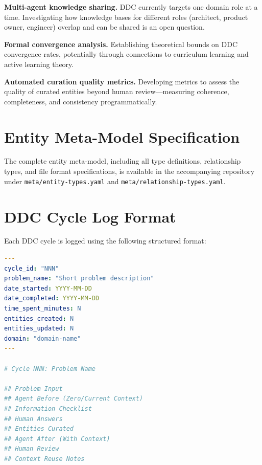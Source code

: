 \documentclass[11pt,a4paper]{article}
\begin{document}
\textbf{Multi-agent knowledge sharing.} DDC currently targets one domain role at a time. Investigating how knowledge bases for different roles (architect, product owner, engineer) overlap and can be shared is an open question.

\textbf{Formal convergence analysis.} Establishing theoretical bounds on DDC convergence rates, potentially through connections to curriculum learning and active learning theory.

\textbf{Automated curation quality metrics.} Developing metrics to assess the quality of curated entities beyond human review---measuring coherence, completeness, and consistency programmatically.




\appendix

\section{Entity Meta-Model Specification}
\label{app:metamodel}

The complete entity meta-model, including all type definitions, relationship types, and file format specifications, is available in the accompanying repository under \texttt{meta/entity-types.yaml} and \texttt{meta/relationship-types.yaml}.

\section{DDC Cycle Log Format}
\label{app:cyclelog}

Each DDC cycle is logged using the following structured format:

\begin{lstlisting}[language=yaml,caption={DDC cycle log format.}]
---
cycle_id: "NNN"
problem_name: "Short problem description"
date_started: YYYY-MM-DD
date_completed: YYYY-MM-DD
time_spent_minutes: N
entities_created: N
entities_updated: N
domain: "domain-name"
---

# Cycle NNN: Problem Name

## Problem Input
## Agent Before (Zero/Current Context)
## Information Checklist
## Human Answers
## Entities Curated
## Agent After (With Context)
## Human Review
## Context Reuse Notes
\end{lstlisting}
\end{document}

